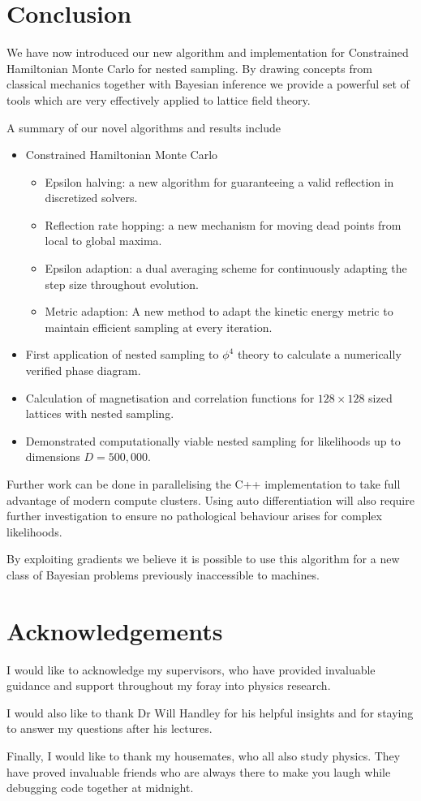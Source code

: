 \documentclass[11pt]{article}
\begin{document}
    \section{Conclusion}\label{sec:conclusion}
    We have now introduced our new algorithm and implementation for Constrained Hamiltonian Monte Carlo for nested sampling.
    By drawing concepts from classical mechanics together with Bayesian inference we provide a powerful
    set of tools which are very effectively applied to lattice field theory.

    A summary of our novel algorithms and results include
    \begin{itemize}
        \item Constrained Hamiltonian Monte Carlo
        \begin{itemize}
            \item Epsilon halving: a new algorithm for guaranteeing a valid reflection in discretized solvers.
            \item Reflection rate hopping: a new mechanism for moving dead points from local to global maxima.
            \item Epsilon adaption: a dual averaging scheme for continuously adapting the step size throughout evolution.
            \item Metric adaption: A new method to adapt the kinetic energy metric to maintain efficient sampling at every iteration.
        \end{itemize}
        \item First application of nested sampling to $\phi^4$ theory to calculate a numerically verified phase diagram.
        \item Calculation of magnetisation and correlation functions for $128 \times 128$ sized lattices with nested sampling.
        \item Demonstrated computationally viable nested sampling for likelihoods up to dimensions $D=500,000$.
    \end{itemize}


    Further work can be done in parallelising the C++ implementation to take full advantage of modern compute clusters.
    Using auto differentiation will also require further investigation to ensure no pathological behaviour arises for
    complex likelihoods.

    By exploiting gradients we believe it is possible to use this algorithm for a new class of
    Bayesian problems previously inaccessible to machines.

\section*{Acknowledgements}
    I would like to acknowledge my supervisors, who have provided invaluable guidance and support throughout my
    foray into physics research.

    I would also like to thank Dr Will Handley for his helpful insights
    and for staying to answer my questions after his lectures.

    Finally, I would like to thank my housemates, who all also study physics.
    They have proved invaluable friends who are always there to make you laugh while debugging code together at midnight.
\end{document}
